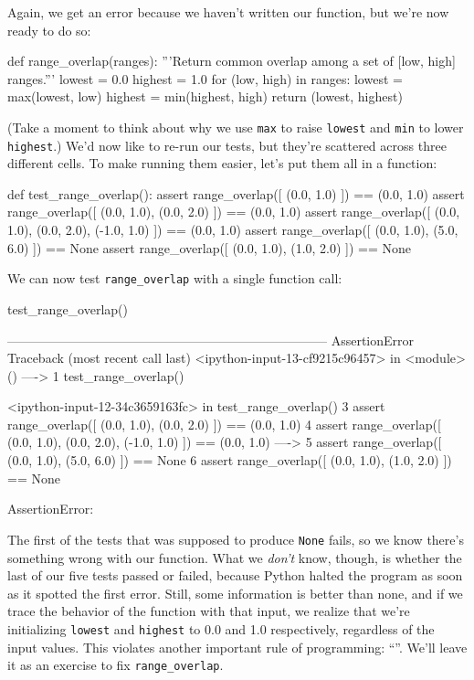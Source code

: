 \documentclass{book}
\begin{document}
Again, we get an error because we haven't written our function, but
we're now ready to do so:

\begin{VerbIn}
def range_overlap(ranges):
    '''Return common overlap among a set of [low, high] ranges.'''
    lowest = 0.0
    highest = 1.0
    for (low, high) in ranges:
        lowest = max(lowest, low)
        highest = min(highest, high)
    return (lowest, highest)
\end{VerbIn}

(Take a moment to think about why we use \texttt{max} to raise
\texttt{lowest} and \texttt{min} to lower \texttt{highest}.) We'd now
like to re-run our tests, but they're scattered across three different
cells. To make running them easier, let's put them all in a function:

\begin{VerbIn}
def test_range_overlap():
    assert range_overlap([ (0.0, 1.0) ]) == (0.0, 1.0)
    assert range_overlap([ (0.0, 1.0), (0.0, 2.0) ]) == (0.0, 1.0)
    assert range_overlap([ (0.0, 1.0), (0.0, 2.0), (-1.0, 1.0) ]) == (0.0, 1.0)
    assert range_overlap([ (0.0, 1.0), (5.0, 6.0) ]) == None
    assert range_overlap([ (0.0, 1.0), (1.0, 2.0) ]) == None
\end{VerbIn}

We can now test \texttt{range\_overlap} with a single function call:

\begin{VerbIn}
test_range_overlap()
\end{VerbIn}

\begin{VerbErr}
---------------------------------------------------------------------------
AssertionError                            Traceback (most recent call last)
<ipython-input-13-cf9215c96457> in <module>()
----> 1 test_range_overlap()

<ipython-input-12-34c3659163fc> in test_range_overlap()
      3     assert range_overlap([ (0.0, 1.0), (0.0, 2.0) ]) == (0.0, 1.0)
      4     assert range_overlap([ (0.0, 1.0), (0.0, 2.0), (-1.0, 1.0) ]) == (0.0, 1.0)
----> 5     assert range_overlap([ (0.0, 1.0), (5.0, 6.0) ]) == None
      6     assert range_overlap([ (0.0, 1.0), (1.0, 2.0) ]) == None

AssertionError: 
\end{VerbErr}

The first of the tests that was supposed to produce \texttt{None} fails,
so we know there's something wrong with our function. What we
\emph{don't} know, though, is whether the last of our five tests passed
or failed, because Python halted the program as soon as it spotted the
first error. Still, some information is better than none, and if we
trace the behavior of the function with that input, we realize that
we're initializing \texttt{lowest} and \texttt{highest} to 0.0 and 1.0
respectively, regardless of the input values. This violates another
important rule of programming:
``''. We'll leave it as an exercise to fix
\texttt{range\_overlap}.
\end{document}
